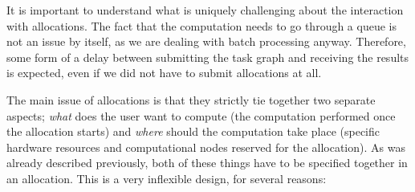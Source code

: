 It is important to understand what is uniquely challenging about the interaction with allocations.
The fact that the computation needs to go through a queue is not an issue by itself, as we are
dealing with batch processing anyway. Therefore, some form of a delay between submitting the task
graph and receiving the results is expected, even if we did not have to submit allocations at all.

The main issue of allocations is that they strictly tie together two separate aspects;
\emph{what} does the user want to compute (the computation performed once the
allocation starts) and \emph{where} should the computation take place (specific hardware
resources and computational nodes reserved for the allocation). As was already described
previously, both of these things have to be specified together in an allocation. This is a very
inflexible design, for several reasons:

